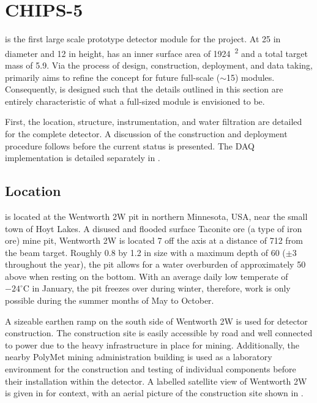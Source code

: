 \section{CHIPS-5} %
\label{sec:chips_detector} %

\chipsfive is the first large scale prototype detector module for the \chips project. At
\SI{25}{} in diameter and \SI{12}{} in height, \chipsfive has an inner surface
area of \SI{1924}{^2} and a total target mass of \SI{5.9}{}. Via the process of
design, construction, deployment, and data taking, \chipsfive primarily aims to refine the \chips
concept for future full-scale ($\sim$\SI{15}{}) modules. Consequently, \chipsfive is
designed such that the details outlined in this section are entirely characteristic of what a
full-sized \chips module is envisioned to be.

First, the location, structure, instrumentation, and water filtration are detailed for the
complete detector. A discussion of the construction and deployment procedure follows before the
current status is presented. The \chipsfive DAQ implementation is detailed separately in
.

\subsection{Location} %
\label{sec:chips_detector_location} %

\chipsfive is located at the Wentworth 2W pit in northern Minnesota, USA, near the small town of
Hoyt Lakes. A disused and flooded surface Taconite ore (a type of iron ore) mine pit, Wentworth 2W
is located \SI{7}{} off the \numi axis at a distance of \SI{712}{} from the
beam target. Roughly \SI{0.8}{} by \SI{1.2}{} in size with a maximum depth of
\SI{60}{} ($\pm$\SI{3}{} throughout the year), the pit allows for a water
overburden of approximately \SI{50}{} above \chipsfive when resting on the bottom. With an
average daily low temperate of $-24^{\circ}\text{C}$ in January, the pit freezes over during
winter, therefore, work is only possible during the summer months of May to October.

A sizeable earthen ramp on the south side of Wentworth 2W is used for detector construction. The
construction site is easily accessible by road and well connected to power due to the heavy
infrastructure in place for mining. Additionally, the nearby PolyMet mining administration
building is used as a laboratory environment for the construction and testing of individual
components before their installation within the detector. A labelled satellite view of Wentworth
2W is given in  for context, with an aerial picture of the construction site
shown in .

